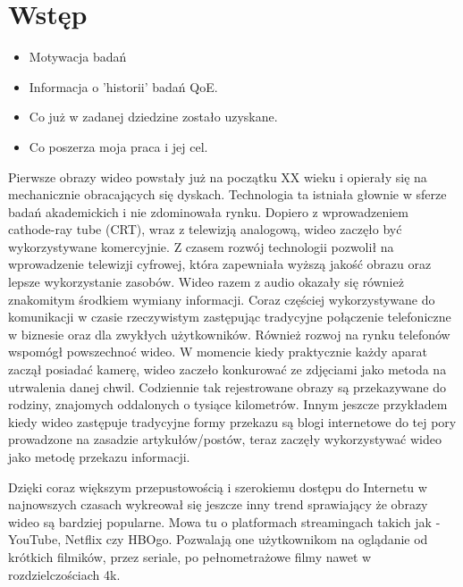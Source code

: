 \chapter{Wstęp}
\label{cha:pierwszyDokument}




\begin{itemize}
\item Motywacja badań
\item Informacja o  'historii' badań QoE.
\item Co już w zadanej dziedzine zostało uzyskane.
\item Co poszerza moja  praca i jej cel.
\end{itemize}

Pierwsze obrazy wideo powstały już na początku XX wieku i opierały się na mechanicznie obracających się dyskach. Technologia ta istniała głownie w sferze badań akademickich i nie zdominowała rynku. Dopiero z wprowadzeniem cathode-ray tube (CRT), wraz z telewizją analogową, wideo zaczęło być wykorzystywane komercyjnie.  Z czasem rozwój technologii pozwolił na wprowadzenie telewizji cyfrowej, która zapewniała wyższą jakość obrazu oraz lepsze wykorzystanie zasobów. Wideo razem z audio okazały się również znakomitym środkiem wymiany informacji. Coraz częściej wykorzystywane do komunikacji w czasie rzeczywistym zastępując tradycyjne połączenie telefoniczne w biznesie oraz dla zwykłych użytkowników. Również rozwoj na rynku telefonów wspomógł powszechnoć wideo. W momencie kiedy praktycznie każdy aparat  zaczął posiadać kamerę, wideo zaczeło konkurować ze zdjęciami jako metoda na utrwalenia danej chwil. Codziennie tak rejestrowane obrazy są przekazywane do rodziny, znajomych oddalonych o tysiące kilometrów. Innym jeszcze przykładem kiedy wideo zastępuje tradycyjne formy przekazu są  blogi internetowe do tej pory prowadzone na zasadzie artykułów/postów, teraz zaczęły wykorzystywać wideo jako metodę  przekazu informacji.

Dzięki coraz większym przepustowością i szerokiemu dostępu do Internetu w najnowszych czasach wykreował się jeszcze inny trend sprawiający że obrazy wideo są bardziej popularne. Mowa tu o platformach streamingach takich jak - YouTube, Netflix czy HBOgo. Pozwalają one użytkownikom na oglądanie od krótkich filmików, przez seriale, po pełnometrażowe filmy nawet w rozdzielczościach 4k. \par


